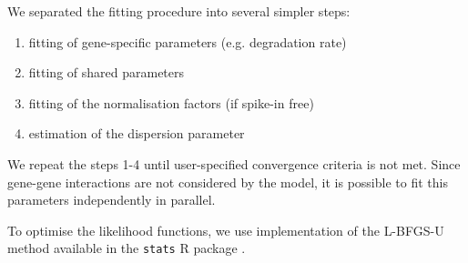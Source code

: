 We separated the fitting procedure into several simpler steps:
\begin{enumerate}
 \item fitting of gene-specific parameters (e.g. degradation rate)
 \item fitting of shared parameters  
 \item fitting of the normalisation factors (if spike-in free)
 \item estimation of the dispersion parameter 
\end{enumerate}
We repeat the steps 1-4 until
user-specified convergence criteria is not met.
 Since gene-gene interactions are not considered by the model, it is possible to 
 fit this parameters independently in parallel. 

To optimise the likelihood functions, 
we use implementation of the {L-BFGS-U} method \citep{byrd1995limited} 
available in the \verb|stats| R package \citep{rlang}.